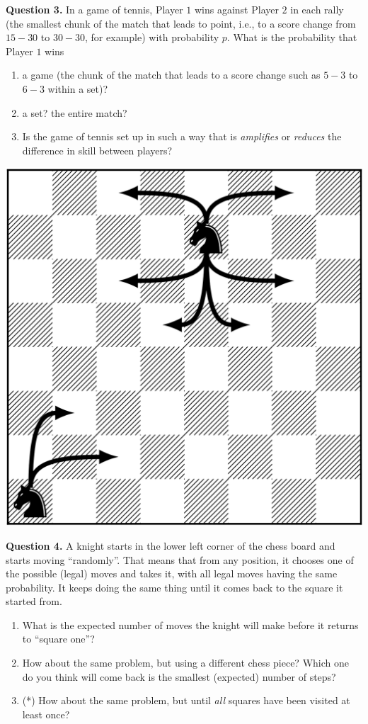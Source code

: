 \documentclass[
]{book}
\providecommand{\tightlist}{%
  \setlength{\itemsep}{0pt}\setlength{\parskip}{0pt}}
\theoremstyle{definition}
\theoremstyle{definition}
\theoremstyle{definition}
\theoremstyle{definition}
\theoremstyle{remark}
\begin{document}
\textbf{Question 3.} In a game of tennis, Player \(1\) wins against Player \(2\) in each rally (the smallest chunk of the match that leads to point, i.e., to a score change from \(15-30\) to \(30-30\), for example) with probability \(p\).
What is the probability that Player \(1\) wins

\begin{enumerate}
\def\labelenumi{\arabic{enumi}.}
\tightlist
\item
  a game (the chunk of the match that leads to a score change such as \(5-3\) to \(6-3\) within a set)?
\item
  a set? the entire match?
\item
  Is the game of tennis set up in such a way that is \emph{amplifies} or \emph{reduces} the difference in skill between players?
\end{enumerate}

\begin{center}\includegraphics[width=0.35\linewidth,style="float:right; padding:10px"]{pics/knight1} \end{center}

\textbf{Question 4.}
A knight starts in the lower left corner of the chess board and starts moving ``randomly''. That means that from any position, it chooses one of the possible (legal) moves and takes it, with all legal moves having the same probability. It keeps doing the same thing until it comes back to the square it started from.

\begin{enumerate}
\def\labelenumi{\arabic{enumi}.}
\tightlist
\item
  What is the expected number of moves the knight will make before it returns to ``square one''?
\item
  How about the same problem, but using a different chess piece? Which one do you think will come back is the smallest (expected) number of steps?
\item
  (*) How about the same problem, but until \emph{all} squares have been visited at least once?
\end{enumerate}
\end{document}

